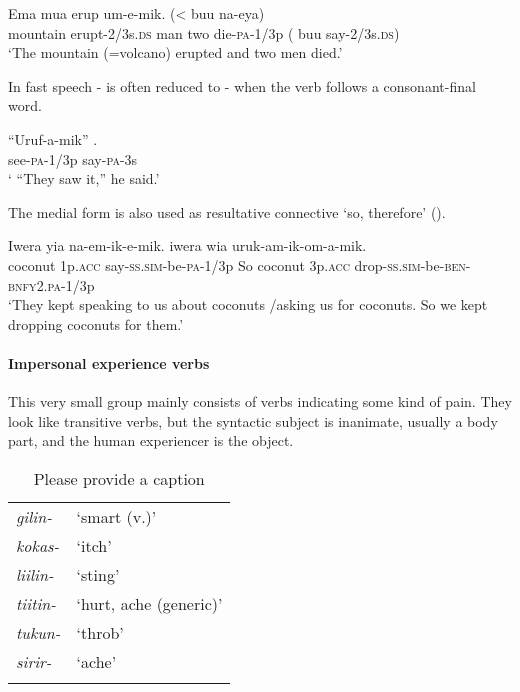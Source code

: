 \ea%
\label{ex:3:x332}
\gll Ema  mua erup um-e-mik. ({{\textless}} buu na-eya) \\
mountain erupt-2/3s.\textsc{ds} man two die-\textsc{pa}-1/3p ( buu say-2/3s.\textsc{ds})\\
\glt`The mountain (=volcano) erupted and two men died.'
\z

In fast speech - is often reduced to - when the verb follows a consonant-final word.

\ea%
\label{ex:3:x333}
\gll ``Uruf-a-mik'' . \\
see-\textsc{pa}-1/3p say-\textsc{pa}-3s \\
\glt` ``They saw it,'' he said.'
\z

The medial form  is also used as resultative connective `so, therefore' ().

\ea%
\label{ex:3:x500}
\gll Iwera yia na-em-ik-e-mik.  iwera wia uruk-am-ik-om-a-mik. \\
coconut 1p.\textsc{acc} say-\textsc{ss}.\textsc{sim}-be-\textsc{pa}-1/3p So coconut 3p.\textsc{acc} drop-\textsc{ss}.\textsc{sim}-be-\textsc{ben}-\textsc{bnfy}2.\textsc{pa}-1/3p\\
\glt`They kept speaking to us about coconuts /asking us for coconuts. So we kept dropping coconuts for them.'
\z

\paragraph{Impersonal experience verbs}\label{sec:3.8.4.4.7}
{}
This very small group mainly consists of verbs indicating some kind of pain. They look like transitive verbs, but the syntactic subject is inanimate, usually a body part, and the human experiencer is the object. 

\begin{table}
\caption{Please provide a caption}
 
\begin{tabular}{>{\itshape}ll}
\mytoprule
gilin- &`smart (v.)'\\
kokas- &`itch'\\
liilin- &`sting'\\
tiitin- &`hurt, ache (generic)'\\
tukun- &`throb'\\
sirir- &`ache'\\
\mybottomrule
\end{tabular}

\end{table}

